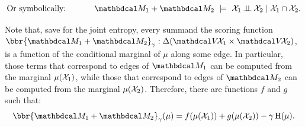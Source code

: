 \begin{subappendices}
\[
    \text{Or symbolically: }\qquad\quad
    \dg M_1 \bundle \dg M_2
        ~\models~
    \X_1 \mathbin{\bot\!\!\!\bot} \X_2 \mid \X_1 \cap \X_2. \]
\begin{lproof}\label{proof:markov-property}
    Note that,
    save for the joint entropy, every summand the scoring function $\bbr{\dg M_1 + \dg M_2}_\gamma : \Delta(\V\!\X_1 \times \V\!\X_2)$, is a function of the conditional marginal of $\mu$ along some edge.
    In particular, those terms that correspond to edges of $\dg M_1$ can be computed from the marginal $\mu(\mathcal X_1)$, while those that correspond to edges of $\dg M_2$ can be computed from the marginal $\mu(\mathcal X_2)$.
    Therefore, there are functions $f$ and $g$ such that:
    \[
        \bbr{\dg M_1 \bundle \dg M_2}_\gamma(\mu) = f(\mu(\X_1)) + g(\mu(\X_2)) - \gamma \H(\mu).
    \]


\end{lproof}
\end{subappendices}
